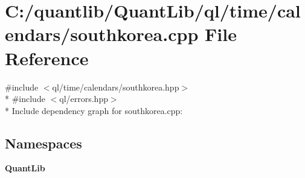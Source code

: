 \section{C\+:/quantlib/\+Quant\+Lib/ql/time/calendars/southkorea.cpp File Reference}
\label{southkorea_8cpp}
{\ttfamily \#include $<$ql/time/calendars/southkorea.\+hpp$>$}\\*
{\ttfamily \#include $<$ql/errors.\+hpp$>$}\\*
Include dependency graph for southkorea.\+cpp\+:
\subsection*{Namespaces}
\begin{DoxyCompactItemize}
\item 
 {\bf Quant\+Lib}
\end{DoxyCompactItemize}
